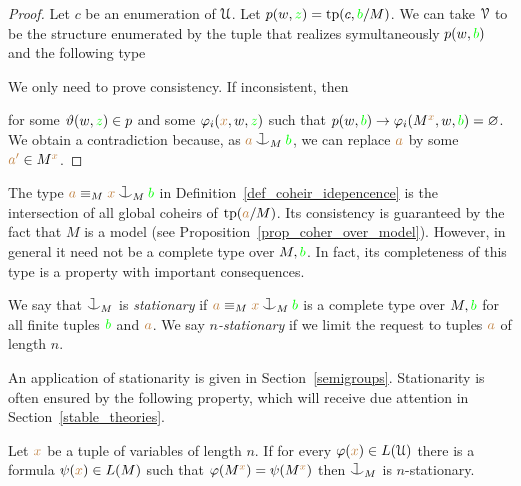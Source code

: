 \begin{proof}
  Let $c$ be an enumeration of $\EuScript U$.
  Let $p(w,{\color{green} z})={\rm tp}(c,{\color{green} b}/M)$.
  We can take $\EuScript V$ to be the structure enumerated by the tuple that realizes symultaneously $p(w,{\color{green} b}) $ and the following type 


  We only need to prove consistency.
  If inconsistent, then 

  
  for some $\vartheta(w,{\color{green} z})\in p$ and some $\varphi_i({\color{brown} x},w,{\color{green} z})$ such that $p(w,{\color{green} b})\rightarrow\varphi_i(M^{\color{brown} x},w,{\color{green} b})=\varnothing$.
  We obtain a contradiction because, as ${\mr a}\cnonfork_M{\gr b}$, we can replace ${\color{brown} a}$ by some ${\color{brown} a'}\in M^{\color{brown} x}$.
\end{proof}


The type ${\mr a}\equiv_M{\mr x}\cnonfork_M{\gr b}$ in Definition~\ref{def_coheir_idepencence} is the intersection of all global coheirs of ${\rm tp}({\color{brown} a}/M)$.
%
Its consistency is guaranteed by the fact that $M$ is a model (see Proposition~\ref{prop_coher_over_model}).
%
However, in general it need not be a complete type over $M,{\color{green} b}$.
%
In fact, its completeness of this type is a property with important consequences.

\begin{definition}\label{def_coheir_stationary} We say that $\cnonfork_M$ is \emph{stationary\/} if ${\mr a}\equiv_M{\mr x}\cnonfork_M{\gr b}$ is a complete type over $M,{\color{green} b}$ for all finite tuples ${\color{green} b}$ and ${\color{brown} a}$.
We say \emph{$n$-stationary\/} if we limit the request to tuples ${\color{brown} a}$ of length $n$.
\end{definition}

An application of stationarity is given in Section~\ref{semigroups}.
Stationarity is often ensured by the following property, which will receive due attention in Section~\ref{stable_theories}.

\begin{proposition}
Let ${\color{brown} x}$ be a tuple of variables of length $n$.
If for every $\varphi({\color{brown} x})\in L(\EuScript U)$ there is a formula $\psi({\color{brown} x})\in L(M)$ such that $\varphi(M^{\color{brown} x})=\psi(M^{\color{brown} x})$ then $\cnonfork_M$ is $n$-stationary.
\end{proposition}

